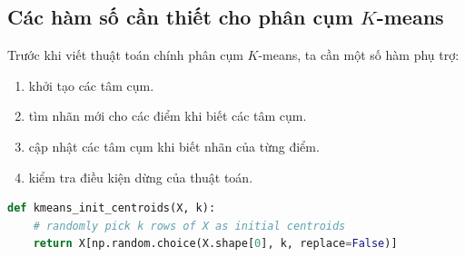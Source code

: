 








\subsection{Các hàm số cần thiết cho phân cụm $K$-means }
Trước khi viết thuật toán chính phân cụm $K$-means, ta cần một số hàm phụ
trợ: 
\begin{enumerate}
    \item {} khởi tạo các tâm cụm.

    \item {} tìm nhãn mới cho các điểm khi
    biết các tâm cụm.

    \item {} cập nhật các tâm cụm khi
    biết nhãn của từng điểm. 

    \item {} kiểm tra điều kiện dừng của thuật toán.
\end{enumerate}


\begin{lstlisting}[language=Python]
def kmeans_init_centroids(X, k):
    # randomly pick k rows of X as initial centroids
    return X[np.random.choice(X.shape[0], k, replace=False)]
\end{lstlisting}

